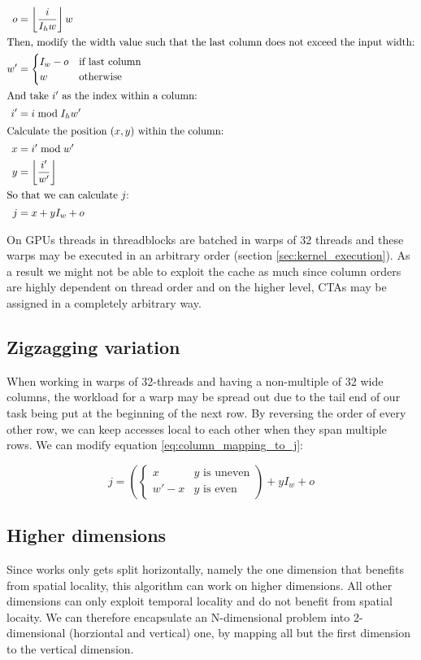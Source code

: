 \begin{align}
    o  &= \left\lfloor \frac{i}{I_h w} \right\rfloor w
    \\ \intertext{Then, modify the width value such that the last column does not exceed the input width:}
    w' &= \begin{cases}
        I_w - o& \text{if last column}
        \\
        w & \text{otherwise}
    \end{cases}
    \\ \intertext{And take $i'$ as the index within a column:}
    i' &= i \bmod I_h w'
    \\ \intertext{Calculate the position $(x, y)$ within the column:}
    x & = i' \bmod w'
    \\ 
    y & = \left\lfloor \frac{i'}{w'} \right\rfloor
    \\ \intertext{So that we can calculate $j$:}
    \label{eq:column_mapping_to_j}
    j  &= x + y I_w + o
\end{align}

On GPUs threads in threadblocks are batched in warps of 32 threads and these warps may be executed in an arbitrary order (section \ref{sec:kernel_execution}).
As a result we might not be able to exploit the cache as much since column orders are highly dependent on thread order and on the higher level, CTAs may be assigned in a completely arbitrary way.

\subsection{Zigzagging variation}
When working in warps of 32-threads and having a non-multiple of 32 wide columns, the workload for a warp may be spread out due to the tail end of our task being put at the beginning of the next row.
By reversing the order of every other row, we can keep accesses local to each other when they span multiple rows.
We can modify equation \ref{eq:column_mapping_to_j}:

\begin{equation}
    j = \left(\begin{cases}
        x & y \text{ is uneven}
        \\
        w' - x & y \text{ is even}
    \end{cases}\right)  + y I_w + o
\end{equation}

\subsection{Higher dimensions}
Since works only gets split horizontally, namely the one dimension that benefits from spatial locality, this algorithm can work on higher dimensions.
All other dimensions can only exploit temporal locality and do not benefit from spatial locaity.
We can therefore encapsulate an N-dimensional problem into 2-dimensional (horziontal and vertical) one, by mapping all but the first dimension to the vertical dimension.

